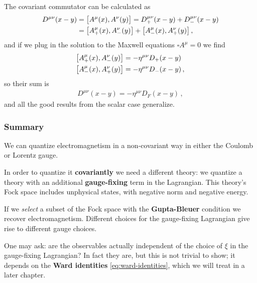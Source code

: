 \documentclass[main.tex]{subfiles}
\begin{document}
The covariant commutator can be calculated as 
%
\begin{align}
D^{\mu \nu } (x-y) &= \qty[A^{\mu  }(x), A^{\nu }(y)]  = D^{\mu \nu }_{+}(x-y) + D^{\mu \nu }_{-} (x-y)  \\
&= \qty[A^{\mu }_{+} (x), A^{\nu }_{-}(y)]
+ \qty[A^{\mu }_{-} (x), A^{\nu }_{+}(y)]
\,,
\end{align}
%
and if we plug in the solution to the Maxwell equations \(\square A^{\mu } = 0\) we find 
%
\begin{align}
\qty[A^{\mu }_{+} (x), A^{\nu }_{-}(y)] &= - \eta^{\mu \nu } D_{+}(x-y) \\
\qty[A^{\mu }_{-} (x), A^{\nu }_{+}(y)] &= - \eta^{\mu \nu } D_{-}(x-y)
\,,
\end{align}
%
so their sum is 
%
\begin{align}
D^{\mu \nu } (x-y) = - \eta^{\mu \nu } D_F(x-y)
\,,
\end{align}
%
and all the good results from the scalar case generalize. 

\subsubsection{Summary}

We can quantize electromagnetism in a non-covariant way in either the Coulomb or Lorentz gauge. 

In order to quantize it \textbf{covariantly} we need a different theory: we quantize a theory with an additional \textbf{gauge-fixing} term in the Lagrangian. 
This theory's Fock space includes unphysical states, with negative norm and negative energy. 

If we \emph{select} a subset of the Fock space with the \textbf{Gupta-Bleuer} condition we recover electromagnetism. 
Different choices for the gauge-fixing Lagrangian give rise to different gauge choices. 

One may ask: are the observables actually independent of the choice of \(\xi \) in the gauge-fixing Lagrangian? In fact they are, but this is not trivial to show; it depends on the \textbf{Ward identities} \eqref{eq:ward-identities}, which we will treat in a later chapter.
\end{document}
